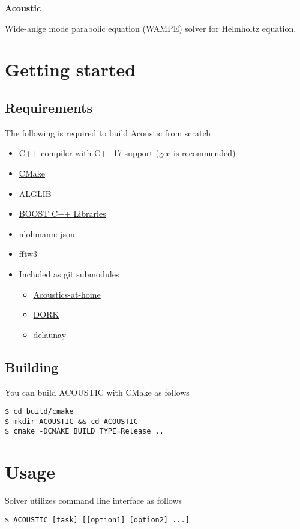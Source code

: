 \documentclass[12pt]{extarticle}
\begin{document}
    \centerline{\bfseries\LARGE Acoustic}
    \bigskip
    Wide-anlge mode parabolic equation (WAMPE) solver for Helmholtz equation.
    \section{Getting started}
        \subsection{Requirements}
            The following is required to build Acoustic from scratch
            \begin{itemize}
                \item C++ compiler with C++17 support (\href{https://gcc.gnu.org/}{gcc} is recommended)
                \item \href{https://cmake.org/}{CMake}
                \item \href{https://www.alglib.net/}{ALGLIB}
                \item \href{https://www.boost.org/}{BOOST C++ Libraries}
                \item \href{https://github.com/nlohmann/json}{nlohmann::json}
                \item \href{http://www.fftw.org/}{fftw3}
                \item Included as git submodules
                \begin{itemize}
                    \item\href{https://github.com/Nauchnik/Acoustics-at-home/}{Acoustics-at-home}
                    \item\href{https://github.com/GoldFeniks/DORK}{DORK}
                    \item\href{https://github.com/GoldFeniks/delaunay}{delaunay}
                \end{itemize}
            \end{itemize}
        \subsection{Building}
        \par You can build ACOUSTIC with CMake as follows
        \begin{verbatim}
$ cd build/cmake
$ mkdir ACOUSTIC && cd ACOUSTIC
$ cmake -DCMAKE_BUILD_TYPE=Release ..
        \end{verbatim}
    \section{Usage}
        Solver utilizes command line interface as follows
        \begin{verbatim}
$ ACOUSTIC [task] [[option1] [option2] ...]
        \end{verbatim}
\end{document}
